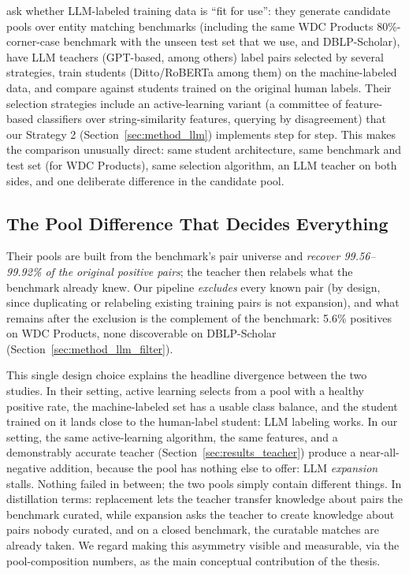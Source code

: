 \documentclass[a4paper,oneside,bibliography=totoc]{scrbook}
\begin{document}
\citet{steiner2026labeling} ask whether LLM-labeled training data is ``fit for use'': they generate candidate pools over entity matching benchmarks (including the same WDC Products 80\%-corner-case benchmark with the unseen test set that we use, and DBLP-Scholar), have LLM teachers (GPT-based, among others) label pairs selected by several strategies, train students (Ditto/RoBERTa among them) on the machine-labeled data, and compare against students trained on the original human labels. Their selection strategies include an active-learning variant (a committee of feature-based classifiers over string-similarity features, querying by disagreement) that our Strategy 2 (Section~\ref{sec:method_llm}) implements step for step. This makes the comparison unusually direct: same student architecture, same benchmark and test set (for WDC Products), same selection algorithm, an LLM teacher on both sides, and one deliberate difference in the candidate pool.

\subsection{The Pool Difference That Decides Everything}
\label{sec:comp_aaron_pool}

Their pools are built from the benchmark's pair universe and \emph{recover 99.56--99.92\% of the original positive pairs}; the teacher then relabels what the benchmark already knew. Our pipeline \emph{excludes} every known pair (by design, since duplicating or relabeling existing training pairs is not expansion), and what remains after the exclusion is the complement of the benchmark: 5.6\% positives on WDC Products, none discoverable on DBLP-Scholar (Section~\ref{sec:method_llm_filter}).

This single design choice explains the headline divergence between the two studies. In their setting, active learning selects from a pool with a healthy positive rate, the machine-labeled set has a usable class balance, and the student trained on it lands close to the human-label student: LLM labeling works. In our setting, the same active-learning algorithm, the same features, and a demonstrably accurate teacher (Section~\ref{sec:results_teacher}) produce a near-all-negative addition, because the pool has nothing else to offer: LLM \emph{expansion} stalls. Nothing failed in between; the two pools simply contain different things. In distillation terms: replacement lets the teacher transfer knowledge about pairs the benchmark curated, while expansion asks the teacher to create knowledge about pairs nobody curated, and on a closed benchmark, the curatable matches are already taken. We regard making this asymmetry visible and measurable, via the pool-composition numbers, as the main conceptual contribution of the thesis.
\end{document}
